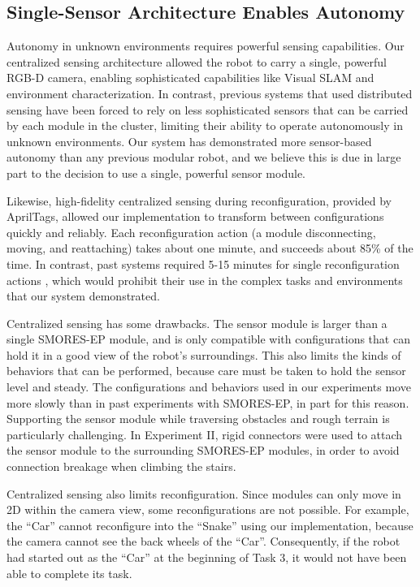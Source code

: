 \documentclass[12pt]{article}
\begin{document}
\subsection{Single-Sensor Architecture Enables Autonomy}
%
Autonomy in unknown environments requires powerful sensing capabilities.  Our centralized sensing architecture allowed the robot to carry a single, powerful RGB-D camera, enabling sophisticated capabilities like Visual SLAM and environment characterization. In contrast, previous systems that used distributed sensing have been forced to rely on less sophisticated sensors that can be carried by each module in the cluster, limiting their ability to operate autonomously in unknown environments.   Our system has demonstrated more sensor-based autonomy than any previous modular robot, and we believe this is due in large part to the decision to use a single, powerful sensor module.

Likewise, high-fidelity centralized sensing during reconfiguration, provided by AprilTags, allowed our implementation to transform between configurations quickly and reliably.  Each reconfiguration action (a module disconnecting, moving, and reattaching) takes about one minute, and succeeds about 85\% of the time.  In contrast, past systems required 5-15 minutes for single reconfiguration actions \cite{Yim2007, Rubenstein2004,Murata2006}, which would prohibit their use in the complex tasks and environments that our system demonstrated. 

Centralized sensing has some drawbacks.  The sensor module is larger than a single SMORES-EP module, and is only compatible with configurations that can hold it in a good view of the robot's surroundings.  This also limits the kinds of behaviors that can be performed, because care must be taken to hold the sensor level and steady.  The configurations and behaviors used in our experiments move more slowly than in past experiments with SMORES-EP, in part for this reason. Supporting the sensor module while traversing obstacles and rough terrain is particularly challenging.  In Experiment II, rigid connectors were used to attach the sensor module to the surrounding SMORES-EP modules, in order to avoid connection breakage when climbing the stairs. 

Centralized sensing also limits reconfiguration. Since modules can only move in 2D within the camera view,  some reconfigurations are not possible.  For example,  the ``Car'' cannot reconfigure into the ``Snake'' using  our implementation, because the camera cannot see the back wheels of the ``Car''. Consequently, if the robot had started out as the ``Car'' at the beginning of Task 3, it would not have been able to complete its task.
\end{document}
